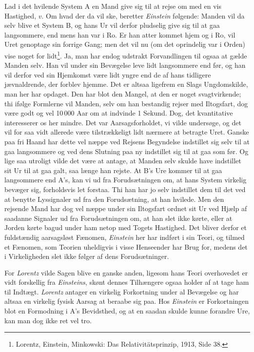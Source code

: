 \documentclass[12pt,a4paper]{article}
\newcommand{\opage}[1]{\marginnote{\footnotesize\textit{[#1]}}}
\begin{document}
Lad i det hvilende System A en Mand give sig til at rejse om med en vis
Hastighed, $v$. Om hvad der da vil ske, beretter \emph{Einstein} følgende:
Manden vil da selv blive et System B, og hans Ur vil derfor pludselig give sig
til at gaa langsommere, end mens han var i Ro. Er han atter kommet hjem og i
Ro, vil Uret genoptage sin forrige Gang; men det vil nu (om det oprindelig var
i Orden) vise noget for lidt\footnote{Lorentz, Einstein, Minkowski: Das
Relativitätsprinzip, 1913, Side 38.}. Ja, man har endog udstrakt Forvandlingen
til ogsaa at gælde Manden selv. Han vil under sin Bevægelse leve lidt
langsommere end før, og han vil derfor ved sin Hjemkomst være lidt yngre end de
af hans tidligere jævnaldrende, der forblev hjemme. Det er altsaa ligefrem en
Slags Ungdomskilde, man her har opdaget. Den har blot den Mangel, at den er
noget svagtvirkende; thi ifølge Formlerne vil Manden, selv om han bestandig
rejser med Iltogsfart, dog være godt og vel 10\,000 Aar om at indvinde 1
Sekund. Dog, det kvantitative interesserer os her mindre. Det var
Aarsagsforholdet, vi vilde undersøge, og det vil for saa vidt allerede være
tilstrækkeligt lidt nærmere at betragte Uret. Ganske paa fri Haand har dette
vel næppe ved Rejsens Begyndelse indstillet sig selv til at gaa langsommere og
ved dens Slutning paa ny indstillet sig til at gaa som før. Og lige saa
utroligt vilde det være at antage, at Manden selv skulde have indstillet sit Ur
til at gaa galt, saa længe han rejste. At B's Ure kommer til at gaa langsommere
end A's, kan vi ud fra Forudsætningen om, at hans System virkelig bevæger sig,
forholdsvis let forstaa. Thi han har jo selv indstillet dem til det ved at
benytte Lyssignaler ud fra den Forudsætning, at han hvilede. Men den rejsende
Mand har dog vel næppe under sin Iltogsfart
\guillemotright ordnet\guillemotleft{} sit Ur ved Hjælp af saadanne Signaler ud
fra Forudsætningen om, at han slet ikke kørte, eller at Jorden kørte bagud
under ham netop med Togets Hastighed. Det bliver derfor et fuldstændig
aarsagsløst Fænomen, \emph{Einstein} her har indført i sin Teori, og tilmed et
Fænomen, som Teorien uheldigvis i visse Henseender har
\opage{29} Brug for, medens det i Virkeligheden slet ikke følger af dens Forudsætninger.

For \emph{Lorentz} vilde Sagen blive en ganske anden, ligesom hans Teori
overhovedet er vidt forskellig fra \emph{Einsteins}, skønt dennes Tilhængere
ogsaa holder af at tage ham til Indtægt. \emph{Lorentz} antager en virkelig
Forkortning under al Bevægelse og har altsaa en virkelig fysisk Aarsag at
beraabe sig paa. Hos \emph{Einstein} er Forkortningen blot en Formodning i A's
Bevidsthed, og at en saadan skulde kunne forandre Ure, kan man dog ikke ret vel
tro.
\end{document}

